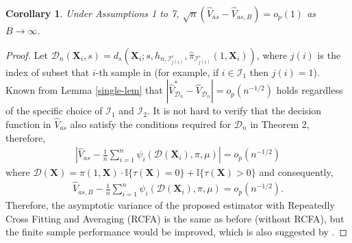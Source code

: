 \documentclass[11pt]{article}
\theoremstyle{referenceplain}
\newtheorem{corollary}{Corollary}[section]
\theoremstyle{referencedefinition}
\theoremstyle{referenceremark}
\begin{document}
\begin{corollary}\label{CV-eq}
    Under Assumptions 1 to 7, $\sqrt{n}\left(\widehat{V}_{as}-\widehat{V}_{as,B}\right)=o_p(1)$ as $B\to\infty$.
\end{corollary}
\begin{proof}
    Let $\mathcal{D}_n(\mathbf{X}_i,s)=d_{s}(\mathbf{X}_i;s,h_{n,\mathcal{I}_{j(i)}^c},\widehat{\pi}_{\mathcal{I}_{j(i)}^c}(1,\mathbf{X}_i))$, where $j(i)$ is the index of subset that $i$-th sample in (for example, if $i\in\mathcal{I}_1$ then $j(i)=1$). Known from Lemma \ref{single-lem} that $|\widehat{V}_{\mathcal{D}_n}^* - \widehat{V}_{\mathcal{D}_n}|=o_p(n^{-1/2})$ holds regardless of the specific choice of $\mathcal{I}_1$ and $\mathcal{I}_2$. It is not hard to verify that the decision function in $\widehat{V}_{as}$ also satisfy the conditions required for $\mathcal{D}_n$ in Theorem 2, therefore, 
    \begin{align*}
        \left|\widehat{V}_{as}-\frac{1}{n}\sum_{i=1}^n \psi_i(\mathcal{D}(\mathbf{X}_i),\pi,\mu)\right|=o_p(n^{-1/2})
    \end{align*}
    where $\mathcal{D}(\mathbf{X})=\pi(1,\mathbf{X})\cdot\mathbb{I}\{\tau(\mathbf{X})=0\}+\mathbb{I}\{\tau(\mathbf{X})>0\}$ and consequently, 
    \begin{align*}
        \widehat{V}_{as,B}-\frac{1}{n}\sum_{i=1}^n \psi_i(\mathcal{D}(\mathbf{X}_i),\pi,\mu)=o_p(n^{-1/2}).
    \end{align*}
    Therefore, the asymptotic variance of the proposed estimator with Repeatedly Cross Fitting and Averaging (RCFA) is the same as before (without RCFA), but the finite sample performance would be improved, which is also suggested by \citet{buhlmann2002analyzing}.
\end{proof}
\end{document}
